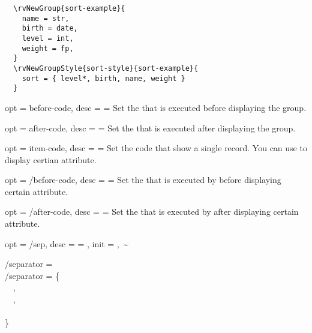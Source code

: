 \documentclass[full]{l3doc}
\begin{document}
\begin{documentation}
\begin{verbatim}
  \rvNewGroup{sort-example}{
    name = str,
    birth = date,
    level = int,
    weight = fp,
  }
  \rvNewGroupStyle{sort-style}{sort-example}{
    sort = { level*, birth, name, weight }
  }
\end{verbatim}

\begin{option}{
  opt = before-code,
  desc = {= }
}
  Set the  that is executed before displaying the group.
\end{option}

\begin{option}{
  opt = after-code,
  desc = {= }
}
  Set the  that is executed after displaying the group.
\end{option}

\begin{option}{
  opt = item-code,
  desc = {= }
}
  Set the code that show a single record. You can use  to display
  certian attribute.
\end{option}

\begin{option}{
  opt = {/before-code},
  desc = {= }
}
  Set the  that is executed by  before displaying
  certain attribute.
\end{option}

\begin{option}{
  opt = {/after-code},
  desc = {= }
}
  Set the  that is executed by  after displaying
  certain attribute.
\end{option}

\begin{option}{
  opt = {/sep},
  desc = {= },
  init = {,~\~}
}
\begin{Syntax}
  /separator =  \\
  /separator = \{ \\
  ~~, \\
  ~~, \\
  ~~ \\
  \}
\end{Syntax}


\end{option}
\end{documentation}
\end{document}
